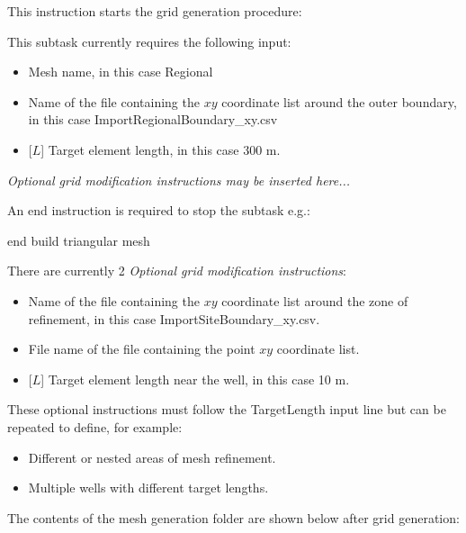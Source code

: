 This instruction starts the grid generation procedure:

    {This subtask currently requires the following input:
     \begin{itemize}
        \item {} Mesh name, in this case {\sf Regional}
        \item {} Name of the file containing the $xy$ coordinate list around the outer boundary, in this case {\sf  ImportRegionalBoundary\_xy.csv}
        \item {} [$L$] Target element length, in this case 300 m.
    \end{itemize}

    {\em Optional grid modification instructions may be inserted here...}

    An end instruction is required to stop the subtask e.g.:

    {\Large \sf end build triangular mesh}
}

There are currently 2 {\em Optional grid modification instructions}:

    {
        \squish
     \begin{itemize}
        \item {} Name of the file containing the $xy$ coordinate list around the zone of refinement, in this case {\sf  ImportSiteBoundary\_xy.csv}.
    \end{itemize}
    }

    {
         \squish
   \begin{itemize}
        \item {} File name of the file containing the point $xy$ coordinate list.
        \item {} [$L$] Target element length near the well, in this case 10 m.
    \end{itemize}
    }

These optional instructions must follow the {\sf TargetLength} input line but can be repeated to define, for example:
\begin{itemize}
\item Different or nested areas of mesh refinement.
\item Multiple wells with different target lengths.
\end{itemize}

The contents of the mesh generation folder are shown below after grid generation:

